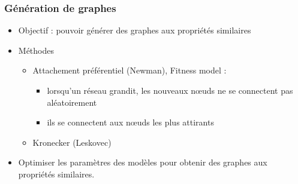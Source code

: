 \documentclass[c]{beamer}
\begin{document}
\begin{frame}
    \frametitle{Génération de graphes}

    \begin{itemize}
        \item<1-> Objectif : pouvoir générer des graphes aux propriétés similaires
        \item<2-> Méthodes
            \begin{itemize}
                \item Attachement préférentiel (Newman), Fitness model : 
                    \begin{itemize}
                        \item lorsqu'un réseau grandit, les nouveaux n\oe{}uds
                            ne se connectent pas aléatoirement
                        \item ils se connectent aux n\oe{}uds les plus attirants
                    \end{itemize}
                \item Kronecker (Leskovec)
            \end{itemize}
        \item<3-> Optimiser les paramètres des modèles pour obtenir des graphes
            aux propriétés similaires.
    \end{itemize}
\end{frame}
\end{document}
